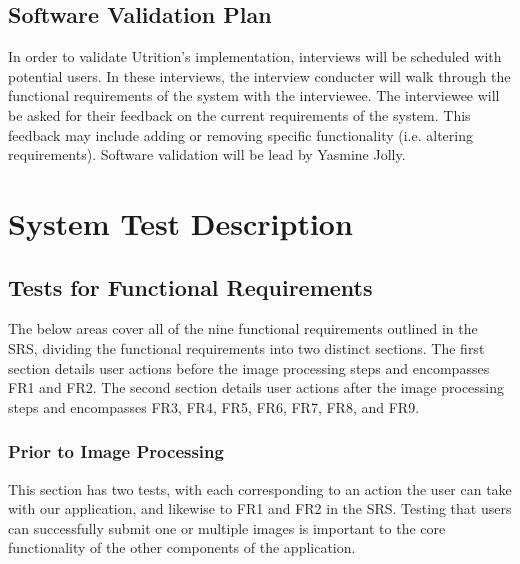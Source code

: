 \documentclass[12pt, titlepage]{article}
\begin{document}
	\subsection{Software Validation Plan}
	
	
	
	
	In order to validate Utrition's implementation, interviews will be scheduled with potential users. In these interviews, the interview conducter will walk through the functional requirements of the system with the interviewee. The interviewee will be asked for their feedback on the current requirements of the system. This feedback may include adding or removing specific functionality (i.e. altering requirements). Software validation will be lead by Yasmine Jolly. 
	
	\section{System Test Description}
	
	\subsection{Tests for Functional Requirements}
	The below areas cover all of the nine functional requirements outlined in the SRS, dividing the functional requirements into two distinct sections. The first section details user actions before the image processing steps and encompasses FR1 and FR2. The second section details user actions after the image processing steps and encompasses FR3, FR4, FR5, FR6, FR7, FR8, and FR9.
	
	\subsubsection{Prior to Image Processing}
	This section has two tests, with each corresponding to an action the user can take with our application, and likewise to FR1 and FR2 in the SRS. Testing that users can successfully submit one or multiple images is important to the core functionality of the other components of the application.
	
\end{document}
